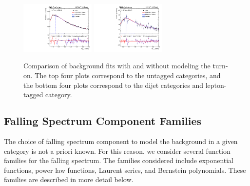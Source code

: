 \begin{figure}
\begin{center}
        \includegraphics[width=0.33\textwidth]{fig/turnon_comparison/plot_cat503_prefit_new.pdf}
        \includegraphics[width=0.33\textwidth]{fig/turnon_comparison/over_plot6789_prefit_new.pdf}
        \caption{Comparison of background fits with and without modeling the turn-on. 
        The top four plots correspond to the untagged categories, and the bottom four plots correspond to the dijet categories and lepton-tagged category.}
		\label{fig:compare_turnon_fits}
	\end{center}
\end{figure}

\subsection{Falling Spectrum Component Families}
The choice of falling spectrum component to model the background in a given category is not a priori known. For this reason, we consider several function families for the falling spectrum. 
The families considered include exponential functions, power law functions, Laurent series, and Bernstein polynomials.
These families are described in more detail below.

